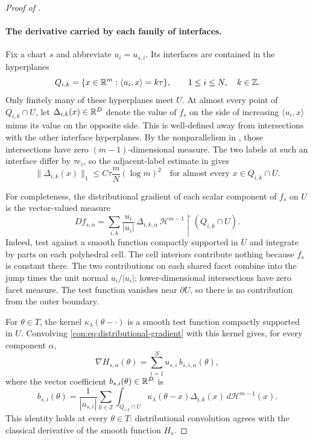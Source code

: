 \begin{proof}[Proof of ]
\paragraph{The derivative carried by each family of interfaces.}
Fix a chart $s$ and abbreviate $u_i=u_{s,i}$. Its interfaces are contained
in the hyperplanes
\[
  Q_{i,k}=\{x\in\mathbb R^m:\langle u_i,x\rangle=k\tau\},
  \qquad 1\le i\le N,\quad k\in\mathbb Z.
\]
Only finitely many of these hyperplanes meet $U$. At almost every point
of $Q_{i,k}\cap U$, let $\Delta_{i,k}(x)\in\mathbb R^D$ denote the value of
$f_s$ on the side of increasing $\langle u_i,x\rangle$ minus its value
on the opposite side. This is well-defined away from intersections with
the other interface hyperplanes. By the nonparallelism in
, those intersections have zero
$(m-1)$-dimensional measure. The two labels at such an interface differ
by $\tau e_i$, so the adjacent-label estimate in  gives
\begin{equation}
  \|\Delta_{i,k}(x)\|_1
      \le C\tau\frac{m}{N}(\log m)^2
  \quad\text{for almost every }x\in Q_{i,k}\cap U.
  \label{con:eq:jump-bound}
\end{equation}

For completeness, the distributional gradient of each scalar component
of $f_s$ on $U$ is the vector-valued measure
\begin{equation}
  D f_{s,\alpha}
   =\sum_{i,k}\frac{u_i}{|u_i|}\,
       \Delta_{i,k,\alpha}\,
       \mathcal H^{m-1}\!\restriction(Q_{i,k}\cap U).
  \label{con:eq:distributional-gradient}
\end{equation}
Indeed, test against a smooth function compactly supported in $U$ and
integrate by parts on each polyhedral cell. The cell interiors contribute
nothing because $f_s$ is constant there. The two contributions on each
shared facet combine into the jump times the unit normal $u_i/|u_i|$;
lower-dimensional intersections have zero facet measure. The test
function vanishes near $\partial U$, so there is no contribution from
the outer boundary.

For $\theta\in T$, the kernel $\kappa_\lambda(\theta-\cdot)$ is a smooth
test function compactly supported in $U$. Convolving
\eqref{con:eq:distributional-gradient} with this kernel gives, for every
component $\alpha$,
\begin{equation}
  \nabla H_{s,\alpha}(\theta)
       =\sum_{i=1}^N u_{s,i}\,b_{s,i,\alpha}(\theta),
  \label{con:eq:gradient-representation}
\end{equation}
where the vector coefficient $b_{s,i}(\theta)\in\mathbb R^D$ is
\begin{equation}
  b_{s,i}(\theta)=\frac{1}{|u_{s,i}|}
       \sum_{k\in\mathbb Z}\int_{Q_{i,k}\cap U}
       \kappa_\lambda(\theta-x)\Delta_{i,k}(x)
       \,d\mathcal H^{m-1}(x).
  \label{con:eq:coefficient-formula}
\end{equation}
This identity holds at every $\theta\in T$: distributional convolution
agrees with the classical derivative of the smooth function $H_s$.


\end{proof}
